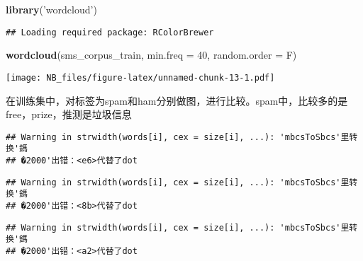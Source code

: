 \documentclass[]{article}
\newenvironment{Shaded}{\begin{snugshade}}{\end{snugshade}}
\newcommand{\KeywordTok}[1]{\textcolor[rgb]{0.13,0.29,0.53}{\textbf{#1}}}
\newcommand{\DataTypeTok}[1]{\textcolor[rgb]{0.13,0.29,0.53}{#1}}
\newcommand{\DecValTok}[1]{\textcolor[rgb]{0.00,0.00,0.81}{#1}}
\newcommand{\FloatTok}[1]{\textcolor[rgb]{0.00,0.00,0.81}{#1}}
\newcommand{\StringTok}[1]{\textcolor[rgb]{0.31,0.60,0.02}{#1}}
\newcommand{\OperatorTok}[1]{\textcolor[rgb]{0.81,0.36,0.00}{\textbf{#1}}}
\newcommand{\NormalTok}[1]{#1}
\begin{document}
\begin{Shaded}
\begin{Highlighting}[]
\KeywordTok{library}\NormalTok{(}\StringTok{'wordcloud'}\NormalTok{)}
\end{Highlighting}
\end{Shaded}

\begin{verbatim}
## Loading required package: RColorBrewer
\end{verbatim}

\begin{Shaded}
\begin{Highlighting}[]
\KeywordTok{wordcloud}\NormalTok{(sms_corpus_train, }\DataTypeTok{min.freq =} \DecValTok{40}\NormalTok{, }\DataTypeTok{random.order =}\NormalTok{ F)}
\end{Highlighting}
\end{Shaded}

\texttt{[image: NB\_files/figure-latex/unnamed-chunk-13-1.pdf]}

在训练集中，对标签为spam和ham分别做图，进行比较。spam中，比较多的是free，prize，推测是垃圾信息

\begin{Shaded}
\end{Shaded}

\begin{verbatim}
## Warning in strwidth(words[i], cex = size[i], ...): 'mbcsToSbcs'里转换'鎷
## �2000'出错：<e6>代替了dot
\end{verbatim}

\begin{verbatim}
## Warning in strwidth(words[i], cex = size[i], ...): 'mbcsToSbcs'里转换'鎷
## �2000'出错：<8b>代替了dot
\end{verbatim}

\begin{verbatim}
## Warning in strwidth(words[i], cex = size[i], ...): 'mbcsToSbcs'里转换'鎷
## �2000'出错：<a2>代替了dot
\end{verbatim}
\end{document}
